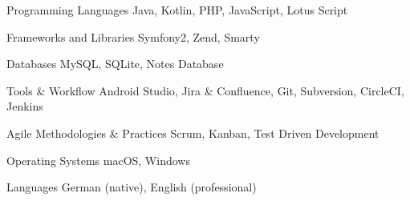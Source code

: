 

\begin{cvskills}

  \cvskill
    {Programming Languages} %
    {Java, Kotlin, PHP, JavaScript, Lotus Script} %
  
  \cvskill
    {Frameworks and Libraries} %
    {Symfony2, Zend, Smarty} %
  
  \cvskill
    {Databases} %
    {MySQL, SQLite, Notes Database} %

  \cvskill
    {Tools \& Workflow} %
    {Android Studio, Jira \& Confluence, Git, Subversion, CircleCI, Jenkins} %

  \cvskill
    {Agile Methodologies \& Practices} %
    {Scrum, Kanban, Test Driven Development} %

  \cvskill
    {Operating Systems} %
    {macOS, Windows} %

  \cvskill
    {Languages} %
    {German (native), English (professional)} %

\end{cvskills}
